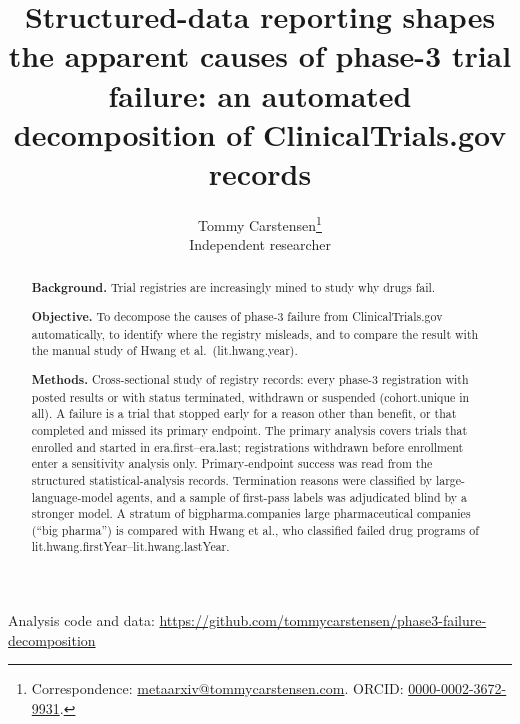 \documentclass[11pt]{article}
\title{\textbf{Structured-data reporting shapes the apparent causes of phase-3 trial failure: an automated decomposition of ClinicalTrials.gov records}}
\author{Tommy Carstensen\thanks{Correspondence: \href{mailto:metaarxiv@tommycarstensen.com}{metaarxiv@tommycarstensen.com}. ORCID: \href{https://orcid.org/0000-0002-3672-9931}{0000-0002-3672-9931}.}\\{\normalsize Independent researcher}}
\date{}
\newcommand{\era}{\num{era.first}--\num{era.last}}
\begin{document}
\maketitle
\vspace{-2em}
\begin{center}\small Analysis code and data: \url{https://github.com/tommycarstensen/phase3-failure-decomposition}\end{center}

\begin{abstract}
\noindent\textbf{Background.} Trial registries are increasingly mined to study why drugs fail.

\noindent\textbf{Objective.} To decompose the causes of phase-3 failure from ClinicalTrials.gov automatically, to identify where the registry misleads, and to compare the result with the manual study of Hwang et al.\ (\num{lit.hwang.year}).

\noindent\textbf{Methods.} Cross-sectional study of registry records: every phase-3 registration with posted results or with status terminated, withdrawn or suspended (\num{cohort.unique} in all). A failure is a trial that stopped early for a reason other than benefit, or that completed and missed its primary endpoint. The primary analysis covers trials that enrolled and started in \era; registrations withdrawn before enrollment enter a sensitivity analysis only. Primary-endpoint success was read from the structured statistical-analysis records. Termination reasons were classified by large-language-model agents, and a sample of first-pass labels was adjudicated blind by a stronger model. A stratum of \num{bigpharma.companies} large pharmaceutical companies (``big pharma'') is compared with Hwang et al., who classified failed drug programs of \num{lit.hwang.firstYear}--\num{lit.hwang.lastYear}.


\end{abstract}
\end{document}
